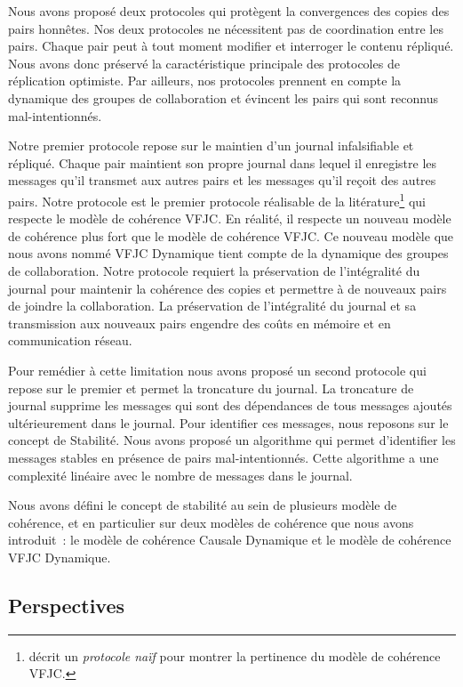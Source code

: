 Nous avons proposé deux protocoles qui protègent la convergences des copies des pairs honnêtes.
Nos deux protocoles ne nécessitent pas de coordination entre les pairs.
Chaque pair peut à tout moment modifier et interroger le contenu répliqué.
Nous avons donc préservé la caractéristique principale des protocoles de réplication optimiste.
Par ailleurs, nos protocoles prennent en compte la dynamique des groupes de collaboration et évincent les pairs qui sont reconnus mal-intentionnés.

Notre premier protocole repose sur le maintien d'un journal infalsifiable et répliqué.
Chaque pair maintient son propre journal dans lequel il enregistre les messages qu'il transmet aux autres pairs et les messages qu'il reçoit des autres pairs.
Notre protocole est le premier protocole réalisable de la litérature\footnote{\textcite{mahajan_2011_cac} décrit un \emph{protocole naïf} pour montrer la pertinence du modèle de cohérence \acs{VFJC}.} qui respecte le modèle de cohérence \acf{VFJC}.
En réalité, il respecte un nouveau modèle de cohérence plus fort que le modèle de cohérence \acs{VFJC}.
Ce nouveau modèle que nous avons nommé \acl{VFJC} Dynamique tient compte de la dynamique des groupes de collaboration.
Notre protocole requiert la préservation de l'intégralité du journal pour maintenir la cohérence des copies et permettre à de nouveaux pairs de joindre la collaboration.
La préservation de l'intégralité du journal et sa transmission aux nouveaux pairs engendre des coûts en mémoire et en communication réseau.

Pour remédier à cette limitation nous avons proposé un second protocole qui repose sur le premier et permet la troncature du journal.
La troncature de journal supprime les messages qui sont des dépendances de tous messages ajoutés ultérieurement dans le journal.
Pour identifier ces messages, nous reposons sur le concept de Stabilité.
Nous avons proposé un algorithme qui permet d'identifier les messages stables en présence de pairs mal-intentionnés.
Cette algorithme a une complexité linéaire avec le nombre de messages dans le journal.

Nous avons défini le concept de stabilité au sein de plusieurs modèle de cohérence, et en particulier sur deux modèles de cohérence que nous avons introduit~: le modèle de cohérence Causale Dynamique et le modèle de cohérence \acl{VFJC} Dynamique.

\subsection{Perspectives}

